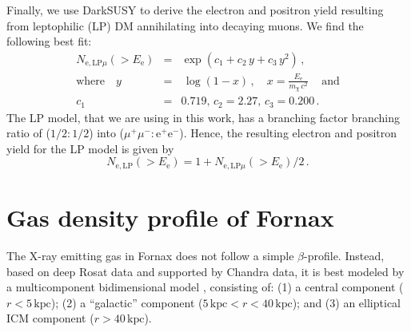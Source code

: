 \documentclass[10pt,aps,pra,reprint,amsmath,amsfonts,amssymb,showpacs,nofootinbib,floatfix]{revtex4-1}
\newcommand{\rmn}{\mathrm}
\newcommand{\ee}{E_\rmn{e}}
\newcommand{\kpc}{\rmn{kpc}}
\newcommand{\e}{\rmn{e}}
\begin{document}
Finally, we use {\sc DarkSUSY} to derive the electron and positron
yield resulting from leptophilic (LP) DM annihilating into decaying
muons. We find the following best fit:
\begin{eqnarray}
N_{\e,\rmn{LP}\mu}(>\ee) &=& \exp\left(c_1+c_2\,y+c_3\,y^2\right)
\,,\nonumber\\
\rmn{where}\quad y&=&\,\log\left(1-x\right)\,,\quad 
x=\frac{\ee}{m_\chi\,c^2}\,\quad\rmn{and}\nonumber\\
c_1&=&0.719,\,c_2=2.27,\,c_3=0.200\,.
\label{eq:lp_elec}
\end{eqnarray}
The LP model, that we are using in this work,
has a branching factor branching ratio of ($1/2:1/2$) into
($\mu^+\mu^-:\e^+\e^-$). Hence, the resulting electron and positron
yield for the LP model is given by
\begin{equation}
N_{\e,\rmn{LP}}(>\ee) =
1+N_{\e,\rmn{LP}\mu}(>\ee)/2\,.
\end{equation}

\section{Gas density profile of Fornax}
The X-ray emitting gas in Fornax does not follow a simple
$\beta$-profile. Instead, based on deep Rosat data and supported by
Chandra data, it is best modeled by a multicomponent bidimensional
model \cite{2002ApJ...565..883P}, consisting of: (1) a central
component ($r<5\,\kpc$); (2) a ``galactic'' component
($5\,\kpc<r<40\,\kpc$); and (3) an elliptical ICM component
($r>40\,\kpc$). 
\end{document}
